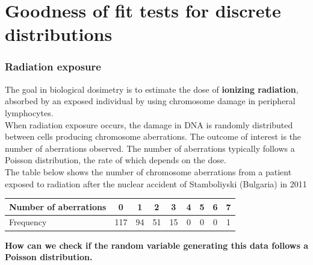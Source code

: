 \documentclass[a4paper]{article}
\begin{document}
\section{Goodness of fit tests for discrete distributions}\label{sec:4}
\subsubsection{Radiation exposure}
The goal in biological dosimetry is to estimate the dose of \textcolor{myred}{\textbf{ionizing radiation}}, absorbed by an exposed individual by using chromosome damage in peripheral lymphocytes.\\
When radiation exposure occurs, the damage in DNA is randomly distributed between cells producing chromosome aberrations. The outcome of interest is the number of aberrations observed. The number of aberrations typically follows a Poisson distribution, the rate of which depends on the dose.\\
The table below shows the number of chromosome aberrations from a patient exposed to radiation after the nuclear accident of Stamboliyski (Bulgaria) in 2011
\begin{table}[H]
	\centering
	\begin{tabular}{@{}lcccccccc@{}}
	\toprule
	Number of aberrations & 0   & 1  & 2  & 3  & 4 & 5 & 6 & 7 \\ \midrule
	Frequency             & 117 & 94 & 51 & 15 & 0 & 0 & 0 & 1 \\ \bottomrule
	\end{tabular}
\end{table}
\begin{greenbox}
	\textbf{How can we check if the random variable generating this data follows a Poisson distribution.}
\end{greenbox}
\end{document}
